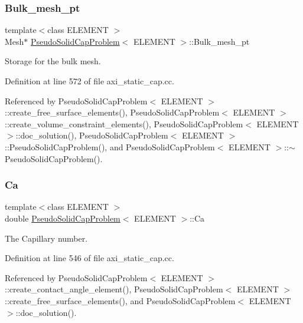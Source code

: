 \subsubsection{\texorpdfstring{Bulk\+\_\+mesh\+\_\+pt}{Bulk\_mesh\_pt}}
{\footnotesize\ttfamily template$<$class E\+L\+E\+M\+E\+NT $>$ \\
Mesh$\ast$ \hyperlink{classPseudoSolidCapProblem}{Pseudo\+Solid\+Cap\+Problem}$<$ E\+L\+E\+M\+E\+NT $>$\+::Bulk\+\_\+mesh\+\_\+pt\hspace{0.3cm}{\ttfamily [private]}}



Storage for the bulk mesh. 



Definition at line 572 of file axi\+\_\+static\+\_\+cap.\+cc.



Referenced by Pseudo\+Solid\+Cap\+Problem$<$ E\+L\+E\+M\+E\+N\+T $>$\+::create\+\_\+free\+\_\+surface\+\_\+elements(), Pseudo\+Solid\+Cap\+Problem$<$ E\+L\+E\+M\+E\+N\+T $>$\+::create\+\_\+volume\+\_\+constraint\+\_\+elements(), Pseudo\+Solid\+Cap\+Problem$<$ E\+L\+E\+M\+E\+N\+T $>$\+::doc\+\_\+solution(), Pseudo\+Solid\+Cap\+Problem$<$ E\+L\+E\+M\+E\+N\+T $>$\+::\+Pseudo\+Solid\+Cap\+Problem(), and Pseudo\+Solid\+Cap\+Problem$<$ E\+L\+E\+M\+E\+N\+T $>$\+::$\sim$\+Pseudo\+Solid\+Cap\+Problem().

\mbox{\label{classPseudoSolidCapProblem_ad29a43062d88106c495d407abeddd88d}} 
\subsubsection{\texorpdfstring{Ca}{Ca}}
{\footnotesize\ttfamily template$<$class E\+L\+E\+M\+E\+NT $>$ \\
double \hyperlink{classPseudoSolidCapProblem}{Pseudo\+Solid\+Cap\+Problem}$<$ E\+L\+E\+M\+E\+NT $>$\+::Ca\hspace{0.3cm}{\ttfamily [private]}}



The Capillary number. 



Definition at line 546 of file axi\+\_\+static\+\_\+cap.\+cc.



Referenced by Pseudo\+Solid\+Cap\+Problem$<$ E\+L\+E\+M\+E\+N\+T $>$\+::create\+\_\+contact\+\_\+angle\+\_\+element(), Pseudo\+Solid\+Cap\+Problem$<$ E\+L\+E\+M\+E\+N\+T $>$\+::create\+\_\+free\+\_\+surface\+\_\+elements(), and Pseudo\+Solid\+Cap\+Problem$<$ E\+L\+E\+M\+E\+N\+T $>$\+::doc\+\_\+solution().

